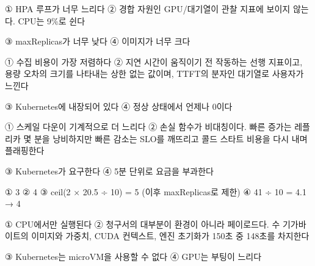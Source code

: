 \begin{tbboptions}
  \item ① HPA 루프가 너무 느리다        ② 경합 자원인 GPU/대기열이 관찰 지표에 보이지 않는다. CPU는 9\%로 쉰다
  \item ③ maxReplicas가 너무 낮다        ④ 이미지가 너무 크다
\end{tbboptions}


\begin{tbboptions}
  \item ① 수집 비용이 가장 저렴하다        ② 지연 시간이 움직이기 전 작동하는 선행 지표이고, 용량 오차의 크기를 나타내는 상한 없는 값이며, TTFT의 분자인 대기열로 사용자가 느낀다
  \item ③ Kubernetes에 내장되어 있다        ④ 정상 상태에서 언제나 0이다
\end{tbboptions}


\begin{tbboptions}
  \item ① 스케일 다운이 기계적으로 더 느리다        ② 손실 함수가 비대칭이다. 빠른 증가는 레플리카 몇 분을 낭비하지만 빠른 감소는 SLO를 깨뜨리고 콜드 스타트 비용을 다시 내며 플래핑한다
  \item ③ Kubernetes가 요구한다        ④ 5분 단위로 요금을 부과한다
\end{tbboptions}


\begin{tbboptions}
  \item ① 3        ② 4        ③ ceil(2 × 20.5 ÷ 10) = 5 (이후 maxReplicas로 제한)        ④ 41 ÷ 10 = 4.1 → 4
\end{tbboptions}


\begin{tbboptions}
  \item ① CPU에서만 실행된다        ② 청구서의 대부분이 환경이 아니라 페이로드다. 수 기가바이트의 이미지와 가중치, CUDA 컨텍스트, 엔진 초기화가 150초 중 148초를 차지한다
  \item ③ Kubernetes는 microVM을 사용할 수 없다        ④ GPU는 부팅이 느리다
\end{tbboptions}

